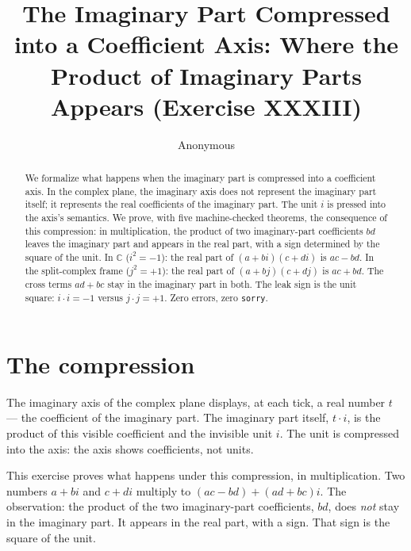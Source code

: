 \documentclass[sigplan,10pt,anonymous,review]{acmart}
\begin{document}
\title{The Imaginary Part Compressed into a Coefficient Axis: Where the\\
Product of Imaginary Parts Appears (Exercise XXXIII)}

\author{Anonymous}

\begin{abstract}
We formalize what happens when the imaginary part is compressed into a
coefficient axis. In the complex plane, the imaginary axis does not
represent the imaginary part itself; it represents the real
coefficients of the imaginary part. The unit $i$ is pressed into the
axis's semantics. We prove, with five machine-checked theorems, the
consequence of this compression: in multiplication, the product of two
imaginary-part coefficients $b d$ leaves the imaginary part and appears
in the real part, with a sign determined by the square of the unit. In
$\mathbb{C}$ ($i^2 = -1$): the real part of $(a+bi)(c+di)$ is
$ac - bd$. In the split-complex frame ($j^2 = +1$): the real part of
$(a+bj)(c+dj)$ is $ac + bd$. The cross terms $ad + bc$ stay in the
imaginary part in both. The leak sign is the unit square: $i \cdot i =
-1$ versus $j \cdot j = +1$. Zero errors, zero \texttt{sorry}.
\end{abstract}


\maketitle

\section{The compression}

The imaginary axis of the complex plane displays, at each tick, a real
number $t$ --- the coefficient of the imaginary part. The imaginary
part itself, $t \cdot i$, is the product of this visible coefficient and
the invisible unit $i$. The unit is compressed into the axis: the axis
shows coefficients, not units.

This exercise proves what happens under this compression, in
multiplication. Two numbers $a + bi$ and $c + di$ multiply to
$(ac - bd) + (ad + bc)i$. The observation: the product of the two
imaginary-part coefficients, $b d$, does \emph{not} stay in the
imaginary part. It appears in the real part, with a sign. That sign is
the square of the unit.
\end{document}
